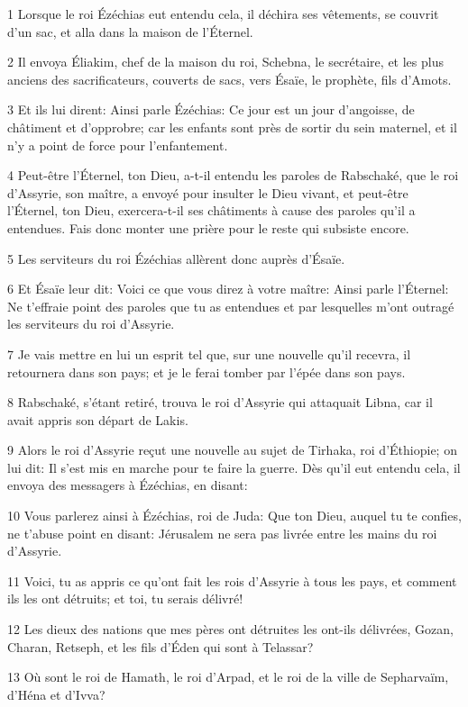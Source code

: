 \par 1 Lorsque le roi Ézéchias eut entendu cela, il déchira ses vêtements, se couvrit d'un sac, et alla dans la maison de l'Éternel.
\par 2 Il envoya Éliakim, chef de la maison du roi, Schebna, le secrétaire, et les plus anciens des sacrificateurs, couverts de sacs, vers Ésaïe, le prophète, fils d'Amots.
\par 3 Et ils lui dirent: Ainsi parle Ézéchias: Ce jour est un jour d'angoisse, de châtiment et d'opprobre; car les enfants sont près de sortir du sein maternel, et il n'y a point de force pour l'enfantement.
\par 4 Peut-être l'Éternel, ton Dieu, a-t-il entendu les paroles de Rabschaké, que le roi d'Assyrie, son maître, a envoyé pour insulter le Dieu vivant, et peut-être l'Éternel, ton Dieu, exercera-t-il ses châtiments à cause des paroles qu'il a entendues. Fais donc monter une prière pour le reste qui subsiste encore.
\par 5 Les serviteurs du roi Ézéchias allèrent donc auprès d'Ésaïe.
\par 6 Et Ésaïe leur dit: Voici ce que vous direz à votre maître: Ainsi parle l'Éternel: Ne t'effraie point des paroles que tu as entendues et par lesquelles m'ont outragé les serviteurs du roi d'Assyrie.
\par 7 Je vais mettre en lui un esprit tel que, sur une nouvelle qu'il recevra, il retournera dans son pays; et je le ferai tomber par l'épée dans son pays.
\par 8 Rabschaké, s'étant retiré, trouva le roi d'Assyrie qui attaquait Libna, car il avait appris son départ de Lakis.
\par 9 Alors le roi d'Assyrie reçut une nouvelle au sujet de Tirhaka, roi d'Éthiopie; on lui dit: Il s'est mis en marche pour te faire la guerre. Dès qu'il eut entendu cela, il envoya des messagers à Ézéchias, en disant:
\par 10 Vous parlerez ainsi à Ézéchias, roi de Juda: Que ton Dieu, auquel tu te confies, ne t'abuse point en disant: Jérusalem ne sera pas livrée entre les mains du roi d'Assyrie.
\par 11 Voici, tu as appris ce qu'ont fait les rois d'Assyrie à tous les pays, et comment ils les ont détruits; et toi, tu serais délivré!
\par 12 Les dieux des nations que mes pères ont détruites les ont-ils délivrées, Gozan, Charan, Retseph, et les fils d'Éden qui sont à Telassar?
\par 13 Où sont le roi de Hamath, le roi d'Arpad, et le roi de la ville de Sepharvaïm, d'Héna et d'Ivva?
